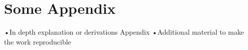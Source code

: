 
\section{Some Appendix}
•In depth explanation or derivations Appendix
•Additional material to make the work reproducible
